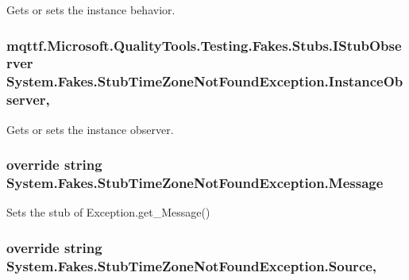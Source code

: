 Gets or sets the instance behavior.

\hypertarget{class_system_1_1_fakes_1_1_stub_time_zone_not_found_exception_afed1f1e9a126a050ade9c58c5f7b2c72}{
\subsubsection[{Instance\-Observer}]{\setlength{\rightskip}{0pt plus 5cm}mqttf.\-Microsoft.\-Quality\-Tools.\-Testing.\-Fakes.\-Stubs.\-I\-Stub\-Observer System.\-Fakes.\-Stub\-Time\-Zone\-Not\-Found\-Exception.\-Instance\-Observer\hspace{0.3cm}{\ttfamily [get]}, {\ttfamily [set]}}}\label{class_system_1_1_fakes_1_1_stub_time_zone_not_found_exception_afed1f1e9a126a050ade9c58c5f7b2c72}


Gets or sets the instance observer.

\hypertarget{class_system_1_1_fakes_1_1_stub_time_zone_not_found_exception_acef10623ab334aa3908206d9bdd5ad8d}{
\subsubsection[{Message}]{\setlength{\rightskip}{0pt plus 5cm}override string System.\-Fakes.\-Stub\-Time\-Zone\-Not\-Found\-Exception.\-Message\hspace{0.3cm}{\ttfamily [get]}}}\label{class_system_1_1_fakes_1_1_stub_time_zone_not_found_exception_acef10623ab334aa3908206d9bdd5ad8d}


Sets the stub of Exception.\-get\-\_\-\-Message()

\hypertarget{class_system_1_1_fakes_1_1_stub_time_zone_not_found_exception_a6133b1edafae694abec6b0a0ce797f22}{
\subsubsection[{Source}]{\setlength{\rightskip}{0pt plus 5cm}override string System.\-Fakes.\-Stub\-Time\-Zone\-Not\-Found\-Exception.\-Source\hspace{0.3cm}{\ttfamily [get]}, {\ttfamily [set]}}}\label{class_system_1_1_fakes_1_1_stub_time_zone_not_found_exception_a6133b1edafae694abec6b0a0ce797f22}


